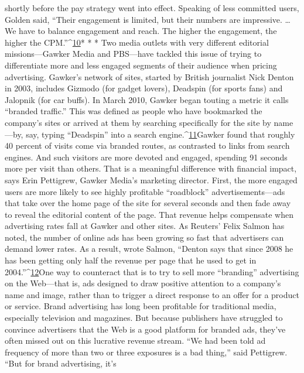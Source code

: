 shortly before the pay strategy went into effect. Speaking of less committed
users, Golden said, ``Their engagement is limited, but their numbers are impressive.
… We have to balance engagement and reach. The higher the engagement,
the higher the CPM.''^{\href{#endnotes-ch2}{10}}* * *
Two media outlets with very different editorial missions—Gawker Media and
PBS—have tackled this issue of trying to differentiate more and less engaged segments
of their audience when pricing advertising.
Gawker’s network of sites, started by British journalist Nick Denton in 2003,
includes Gizmodo (for gadget lovers), Deadspin (for sports fans) and Jalopnik
(for car buffs). In March 2010, Gawker began touting a metric it calls ``branded
traffic.'' This was defined as people who have bookmarked the company’s sites
or arrived at them by searching specifically for the site by name—by, say, typing
``Deadspin'' into a search engine.^{\href{#endnotes-ch2}{11}}Gawker found that roughly 40 percent of visits come via branded routes, as
contrasted to links from search engines. And such visitors are more devoted
and engaged, spending 91 seconds more per visit than others. That is a meaningful
difference with financial impact, says Erin Pettigrew, Gawker Media’s
marketing director.
First, the more engaged users are more likely to see highly profitable ``roadblock''
advertisements—ads that take over the home page of the site for several
seconds and then fade away to reveal the editorial content of the page. That revenue
helps compensate when advertising rates fall at Gawker and other sites. As
Reuters’ Felix Salmon has noted, the number of online ads has been growing so
fast that advertisers can demand lower rates. As a result, wrote Salmon, ``Denton
says that since 2008 he has been getting only half the revenue per page that he
used to get in 2004.''^{\href{#endnotes-ch2}{12}}One way to counteract that is to try to sell more ``branding'' advertising on the
Web—that is, ads designed to draw positive attention to a company’s name and
image, rather than to trigger a direct response to an offer for a product or service.
Brand advertising has long been profitable for traditional media, especially television
and magazines. But because publishers have struggled to convince advertisers
that the Web is a good platform for branded ads, they’ve often missed out on
this lucrative revenue stream. ``We had been told ad frequency of more than two
or three exposures is a bad thing,'' said Pettigrew. ``But for brand advertising, it’s

